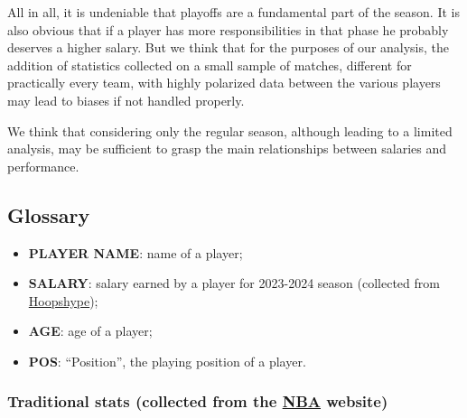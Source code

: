 \documentclass[
]{article}
\providecommand{\tightlist}{%
  \setlength{\itemsep}{0pt}\setlength{\parskip}{0pt}}
\begin{document}
All in all, it is undeniable that playoffs are a fundamental part of the
season. It is also obvious that if a player has more responsibilities in
that phase he probably deserves a higher salary. But we think that for
the purposes of our analysis, the addition of statistics collected on a
small sample of matches, different for practically every team, with
highly polarized data between the various players may lead to biases if
not handled properly.

We think that considering only the regular season, although leading to a
limited analysis, may be sufficient to grasp the main relationships
between salaries and performance.

\hypertarget{glossary}{%
\subsection{Glossary}\label{glossary}}

\begin{itemize}
\tightlist
\item
  \textbf{PLAYER NAME}: name of a player;
\item
  \textbf{SALARY}: salary earned by a player for 2023-2024 season
  (collected from \href{https://hoopshype.com/}{Hoopshype});
\item
  \textbf{AGE}: age of a player;
\item
  \textbf{POS}: ``Position'', the playing position of a player.
\end{itemize}

\hypertarget{traditional-stats-collected-from-the-nba-website}{%
\subsubsection{\texorpdfstring{Traditional stats (collected from the
\href{https://www.nba.com/?47}{NBA}
website)}{Traditional stats (collected from the NBA website)}}\label{traditional-stats-collected-from-the-nba-website}}
\end{document}
